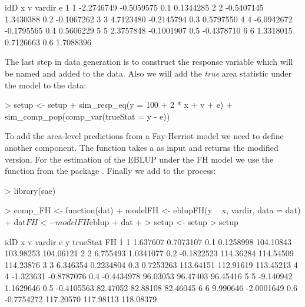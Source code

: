 \documentclass[article]{ajs}
\begin{document}
\begin{Schunk}
\begin{Soutput}
  idD          x          v vardir          e
1   1 -2.2746749 -0.5059575    0.1  0.1344285
2   2 -0.5407145  1.3430388    0.2 -0.1067262
3   3  4.7123480 -0.2145794    0.3  0.5797550
4   4 -6.0942672 -0.1795565    0.4  0.5606229
5   5  2.3757848 -0.1001907    0.5 -0.4378710
6   6  1.3318015  0.7126663    0.6  1.7088396
\end{Soutput}
\end{Schunk}

The last step in data generation is to construct the response variable which will be named  and added to the data. Also we will add the \textit{true} area statistic under the model to the data:

\begin{Schunk}
\begin{Sinput}
> setup <- setup %
+   sim_resp_eq(y = 100 + 2 * x + v + e) %
+   sim_comp_pop(comp_var(trueStat = y - e))
\end{Sinput}
\end{Schunk}

To add the area-level predictions from a Fay-Herriot model we need to define another component. The function takes a  as input and returns the modified version. For the estimation of the EBLUP under the FH model we use the function  from the package  \citep{molina13}. Finally we add  to the process:

\begin{Schunk}
\begin{Sinput}
> library(sae)
\end{Sinput}
\end{Schunk}
\begin{Schunk}
\begin{Sinput}
> comp_FH <- function(dat) {
+   modelFH <- eblupFH(y ~ x, vardir, data = dat)
+   dat$FH <- modelFH$eblup
+   dat
+ }
> setup <- setup %
> setup
\end{Sinput}
\begin{Soutput}
  idD         x          v vardir          e         y  trueStat        FH
1   1  1.637607  0.7073107    0.1  0.1258998 104.10843 103.98253 104.06121
2   2  6.755493  1.0341077    0.2 -0.1822523 114.36284 114.54509 114.23876
3   3  6.346354  0.2234804    0.3  0.7253263 113.64151 112.91619 113.45213
4   4 -1.323631 -0.8787076    0.4 -0.4434978  96.03053  96.47403  96.45416
5   5 -9.140942  1.1629646    0.5 -0.4105563  82.47052  82.88108  82.46045
6   6  9.990646 -2.0001649    0.6 -0.7754272 117.20570 117.98113 118.08379
\end{Soutput}
\end{Schunk}
\end{document}
